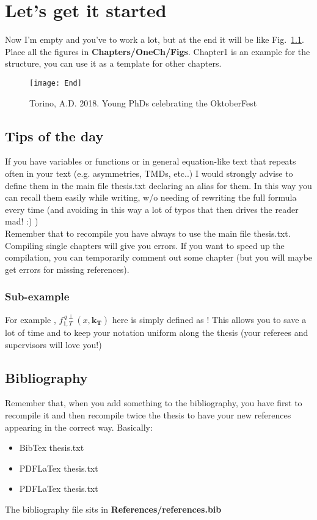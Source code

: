 \chapter{Let's get it started} 
\label{Chap:setup}
\ifpdf
    \graphicspath{{Chapters/OneCh/Figs/Raster/}{Chapters/OneCh/Figs/PDF/}{Chapters/OneCh/Figs/}}
\else
    \graphicspath{{Chapters/OneCh/Figs/Vector/}{Chapters/OneCh/Figs/}}
\fi
Now I'm empty and you've to work a lot, but at the end it will be like Fig.~\ref{Fig:PHD}. Place all the figures in \textbf{Chapters/OneCh/Figs}. Chapter1 is an example for the structure, you can use it as a template for other chapters. 

\begin{figure}
\begin{center}
\texttt{[image: End]}
\caption{Torino, A.D. 2018. Young PhDs celebrating the OktoberFest}
\label{Fig:PHD}
\end{center}
\end{figure}
\section{Tips of the day} 
If you have variables or functions or in general equation-like text that repeats often in your text (e.g. asymmetries, TMDs, etc..) I would strongly advise to define them in the main file thesis.txt declaring an alias for them. In this way you can recall them easily while writing, w/o needing of rewriting the full formula every time (and avoiding in this way a lot of typos that then drives the reader mad! :) ) \\ 
Remember that to recompile you have always to use the main file thesis.txt. Compiling single chapters will give you errors. 
If you want to speed up the compilation, you can temporarily comment out some chapter (but you will maybe get errors for missing references). 

\subsection{Sub-example}

For example , $f_{1,T}^{\, q\perp}(x,\mathbf{k_T})$ here is simply defined as \siv  !  
This allows you to save a lot of time and to keep your notation uniform along the thesis (your referees and supervisors will love you!)

\section{Bibliography} 
Remember that, when you add something to the bibliography, you have first to recompile it and then recompile twice the thesis to have your new references appearing in the correct way. Basically:
\begin{itemize}
\item BibTex thesis.txt
\item PDFLaTex thesis.txt
\item PDFLaTex thesis.txt
\end{itemize} 
The bibliography file sits in \textbf{References/references.bib}

